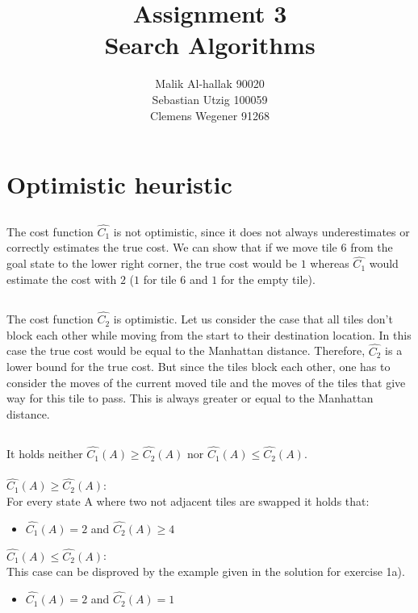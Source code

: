 \documentclass[11pt]{article}
\title{\textbf{Assignment 3\\}Search Algorithms}
\author{Malik Al-hallak 90020\\
		Sebastian Utzig 100059\\
		Clemens Wegener 91268}
\date{}
\begin{document}
\maketitle
\section{Optimistic heuristic}
\subsection{}
The cost function $\hat{C_1}$ is not optimistic, since it does not always underestimates or correctly estimates the true cost. We can show that if we move tile 6 from the goal state to the lower right corner, the true cost would be $1$ whereas $\hat{C_1}$ would estimate the cost with $2$ ($1$ for tile 6 and $1$ for the empty tile).

\subsection{}
The cost function $\hat{C_2}$ is optimistic. Let us consider the case that all tiles don't block each other while moving from the start to their destination location. In this case the true cost would be equal to the Manhattan distance. Therefore, $\hat{C_2}$ is a lower bound for the true cost. But since the tiles block each other, one has to consider the moves of the current moved tile and the moves of the tiles that give way for this tile to pass. This is always greater or equal to the Manhattan distance.

\newpage
\subsection{}
It holds neither $\hat{C_1}(A)\geq\hat{C_2}(A)$ nor $\hat{C_1}(A)\leq\hat{C_2}(A)$.
\\\\$\hat{C_1}(A)\geq\hat{C_2}(A)$:\\
For every state A where two not adjacent tiles are swapped it holds that:
\begin{itemize}
	\item $\hat{C_1}(A)=2$ and $\hat{C_2}(A)\geq 4$
\end{itemize}
$\hat{C_1}(A)\leq\hat{C_2}(A)$:\\
This case can be disproved by the example given in the solution for exercise 1a). \begin{itemize}
	\item $\hat{C_1}(A)=2$ and $\hat{C_2}(A)=1$
\end{itemize}
\end{document}

